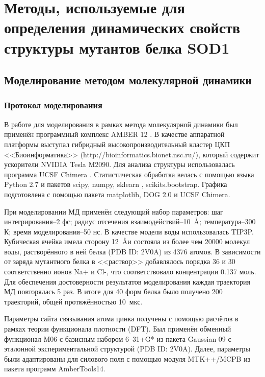 \chapter{Методы, используемые для определения динамических свойств структуры мутантов белка SOD1} \label{chapt2}

\section{Моделирование методом молекулярной динамики} \label{sect_MD}

\subsection{Протокол моделирования} \label{subsect_MD_protocol}

В работе для моделирования в рамках метода молекулярной динамики был применён программный комплекс AMBER 12 \cite{Salomon-Ferrer2013}. В качестве аппаратной платформы выступал гибридный высокопроизводительный кластер ЦКП <<Биоинформатика>> (http://bioinformatics.bionet.nsc.ru/), который содержит ускорители NVIDIA Tesla M2090. Для анализа структуры использовалась программа UCSF Chimera \cite{Pettersen2004}. Статистическая обработка велась с помощью языка Python 2.7 и пакетов scipy, numpy, sklearn \cite{Pedregosa2011}, scikits.bootstrap. Графика подготовлена с помощью пакета matplotlib, DOG 2.0 \cite{Ren2009} и UCSF Chimera.

При моделировании МД применён следующий набор параметров: шаг интегрирования--2 фс; радиус отсечения взаимодействий--10~\AA; температура--300 К; время моделирования--50 нс. В качестве модели воды использовалась TIP3P. Кубическая ячейка имела сторону 12~\AA и состояла из более чем 20000 молекул воды, растворённого в ней белка (PDB ID: 2V0A) из 4376 атомов. В зависимости от заряда мутантного белка в <<раствор>> добавлялось порядка 36 и 30 соответственно ионов Na+ и Cl-, что соответствовало концентрации 0.137 моль.  Для обеспечения достоверности результатов моделирования каждая траектория МД повторялась 5 раз. В итоге для 40 форм белка было получено 200 траекторий, общей протяжённостью  10~мкс.

Параметры сайта связывания атома цинка получены с помощью расчётов в рамках теории функционала плотности (DFT). Был применён обменный функционал M06 с базисным набором 6–31+G* \cite{Zhao2007} из пакета Gaussian 09 \cite{Frisch2009} с эталонной экспериментальной структурой (PDB ID: 2V0A). Далее, параметры были адаптированы для силового поля с помощью модуля MTK++/MCPB \cite{Peters2010} из пакета программ AmberTools14.

